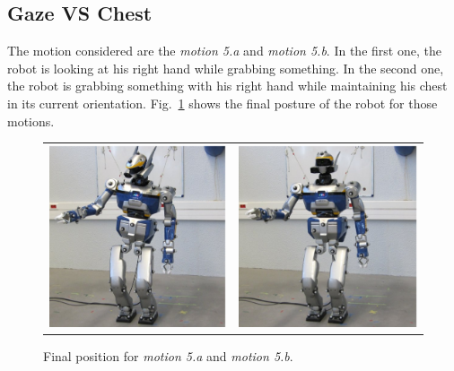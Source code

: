 \documentclass[letterpaper, 10pt, conference]{ieeeconf}      %
\begin{document}
\subsection{Gaze VS Chest}
The motion considered are the \emph{motion 5.a} and \emph{motion 5.b}.
In the first one, the robot is looking at his right hand while grabbing something.
In the second one, the robot is grabbing something with his right hand while
maintaining his chest in its current orientation. Fig.~\ref{fig:motion5}
shows the final posture of the robot for those motions.
\begin{figure}[t]
  \centering
  \begin{tabular}{cc}
    \includegraphics[width=0.48\linewidth]{img/realRobot/5a/5aFinal1.ps} &
    \includegraphics[width=0.48\linewidth]{img/realRobot/5b/5bFinal1.ps} \\
  \end{tabular}
  \caption{Final position for \emph{motion 5.a} and \emph{motion 5.b}.}
  \label{fig:motion5}
\end{figure}
\end{document}
